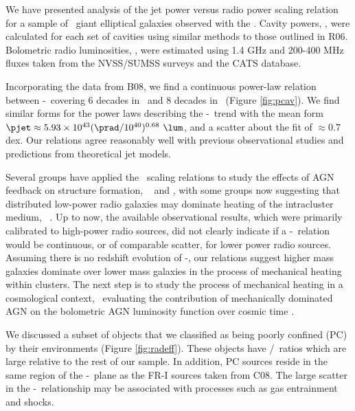 \documentclass{emulateapj}
\begin{document}
We have presented analysis of the jet power versus radio power scaling
relation for a sample of \samp\ giant elliptical galaxies observed
with the \cxo. Cavity powers, \pjet, were calculated for each set of
cavities using similar methods to those outlined in R06. Bolometric
radio luminosities, \prad, were estimated using 1.4 GHz and 200-400
MHz fluxes taken from the NVSS/SUMSS surveys and the CATS database.

Incorporating the data from B08, we find a continuous power-law
relation between \pjet-\prad\ covering 6 decades in \prad\ and 8
decades in \pjet\ (Figure \ref{fig:pcav}). We find similar forms for the power laws describing the
\pjet-\prad\ trend with the mean form $\pjet \approx 5.93\times10^{43}
(\prad/10^{40})^{0.68} ~\lum$, and a scatter about the fit of
$\approx 0.7$ dex.  Our relations agree reasonably well with previous
observational studies and predictions from theoretical jet models.

Several groups have applied the \birzan\ scaling relations to study
the effects of AGN feedback on structure formation, \eg\
\citet{best07} and \citet{2007MNRAS.379..260M}, with some groups now
suggesting that distributed low-power radio galaxies may dominate
heating of the intracluster medium,
\eg\ \citet{2009arXiv0908.3158H}. Up to now, the available
observational results, which were primarily calibrated to high-power
radio sources, did not clearly indicate if a \pjet-\prad\ relation
would be continuous, or of comparable scatter, for lower power radio
sources. Assuming there is no redshift evolution of \pjet-\prad, our
relations suggest higher mass galaxies dominate over lower mass
galaxies in the process of mechanical heating within clusters. The
next step is to study the process of mechanical heating in a
cosmological context, \eg\ evaluating the contribution of mechanically
dominated AGN on the bolometric AGN luminosity function over cosmic
time \citet{2009MNRAS.395..518C}.

We discussed a subset of objects that we classified as being
poorly confined (PC) by their environments (Figure
\ref{fig:radeff}). These objects have \pjet/\prad\ ratios which are
large relative to the rest of our sample. In addition, PC sources
reside in the same region of the \pjet-\prad\ plane as the FR-I
sources taken from C08. 
The large scatter in the \pjet-\prad\  relationship may be associated with
processes such as gas entrainment and shocks.
\end{document}
